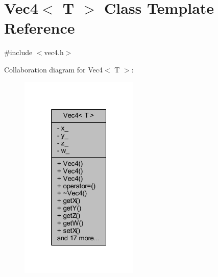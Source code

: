 \hypertarget{class_vec4}{}\section{Vec4$<$ T $>$ Class Template Reference}
\label{class_vec4}


{\ttfamily \#include $<$vec4.\+h$>$}



Collaboration diagram for Vec4$<$ T $>$\+:
\nopagebreak
\begin{figure}[H]
\begin{center}
\leavevmode
\includegraphics[width=160pt]{class_vec4__coll__graph}
\end{center}
\end{figure}

